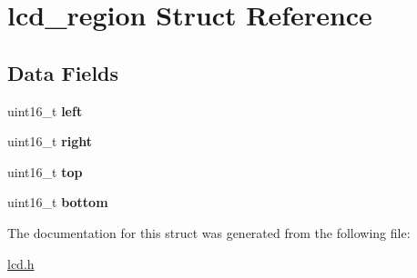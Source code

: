 \hypertarget{structlcd__region}{}\section{lcd\+\_\+region Struct Reference}
\label{structlcd__region}
\subsection*{Data Fields}
\begin{DoxyCompactItemize}
\item 
\hypertarget{structlcd__region_a1002e015b59e71cbe6a04ed8c505a2c8}{}uint16\+\_\+t {\bfseries left}\label{structlcd__region_a1002e015b59e71cbe6a04ed8c505a2c8}

\item 
\hypertarget{structlcd__region_a3db9f359667d3f83caa13dc04fcd8d27}{}uint16\+\_\+t {\bfseries right}\label{structlcd__region_a3db9f359667d3f83caa13dc04fcd8d27}

\item 
\hypertarget{structlcd__region_afb155ede0067e3c0574c4a7220a9fae6}{}uint16\+\_\+t {\bfseries top}\label{structlcd__region_afb155ede0067e3c0574c4a7220a9fae6}

\item 
\hypertarget{structlcd__region_a959b22e4a0ff6cf44a114c3016ada6fd}{}uint16\+\_\+t {\bfseries bottom}\label{structlcd__region_a959b22e4a0ff6cf44a114c3016ada6fd}

\end{DoxyCompactItemize}


The documentation for this struct was generated from the following file\+:\begin{DoxyCompactItemize}
\item 
\hyperlink{lcd_8h}{lcd.\+h}\end{DoxyCompactItemize}
